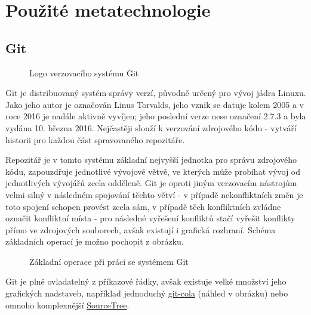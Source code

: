 \section{Použité metatechnologie}

\subsection{Git}
\label{subsec:git}

\begin{figure}
 \centering
 
 \caption{Logo verzovacího systému Git}
\end{figure}

Git je distribuovaný systém správy verzí, původně určený pro vývoj jádra Linuxu. Jako jeho autor je označován Linus Torvalds, jeho vznik se datuje kolem 2005 a v roce 2016 je nadále aktivně vyvíjen; jeho poslední verze nese označení 2.7.3 a byla vydána 10. března 2016. Nejčastěji slouží k verzování zdrojového kódu - vytváří historii pro každou část spravovaného repozitáře.

Repozitář je v tomto systému základní nejvyšší jednotka pro správu zdrojového kódu, zapouzdřuje jednotlivé vývojové větvě, ve kterých může probíhat vývoj od jednotlivých vývojářů zcela odděleně. Git je oproti jiným verzovacím nástrojům velmi silný v následném spojování těchto větví - v případě nekonfliktních změn je toto spojení schopen provést zcela sám, v případě těch konfliktních zvládne označit konfliktní místa - pro následné vyřešení konfliktů stačí vyřešit konflikty přímo ve zdrojových souborech, avšak existují i grafická rozhraní. Schéma základních operací je možno pochopit z obrázku.

\begin{figure}[H]
 	\centering
 	
 	\caption{Základní operace při práci se systémem Git}
 	\label{fig:git-operations}
\end{figure}

Git je plně ovladatelný z příkazové řádky, avšak existuje velké množství jeho grafických nadstaveb, například jednoduchý \href{http://git-cola.github.io/}{git-cola} (náhled v obrázku) nebo omnoho komplexnější \href{https://www.sourcetreeapp.com/}{SourceTree}.

